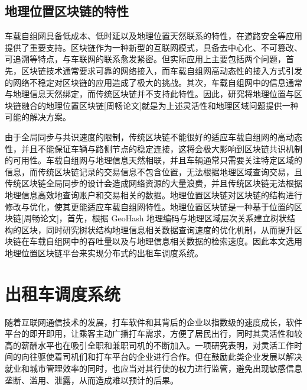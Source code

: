 \subsection{地理位置区块链的特性}
车载自组网具备低成本、低时延以及地理位置天然联系的特性，在道路安全等应用提供了重要支持。区块链作为一种新型的互联网模式，具备去中心化、不可篡改、可追溯等特点，与车联网的联系愈发紧密。但实际应用上主要包括两个问题，首先，区块链技术通常要求可靠的网络接入，而车载自组网高动态性的接入方式引发的网络不稳定对区块链的应用造成了极大的挑战。其次，车载自组网中的信息通常与地理信息天然绑定，而传统区块链并不支持此特性。因此，研究将地理位置与区块链融合的地理位置区块链[周畅论文]就是为上述灵活性和地理区域问题提供一种可能的解决方案。\par
由于全局同步与共识速度的限制，传统区块链不能很好的适应车载自组网的高动态性，并且不能保证车辆与路侧节点的稳定连接，这将会极大影响到区块链共识机制的可用性。车载自组网与地理信息天然相联，并且车辆通常只需要关注特定区域的信息，而传统区块链记录的交易信息不包含位置，无法根据地理区域查询交易，且传统区块链全局同步的设计会造成网络资源的大量浪费，并且传统区块链无法根据地理信息高效地查询账户和交易相关的数据。地理位置区块链对区块链的结构进行修改与优化，使其更能适应车载自组网特性。地理位置区块链是一种基于位置的区块链[周畅论文]，首先，根据 GeoHash 地理编码与地理区域层次关系建立树状结构的区块，同时研究树状结构地理信息相关数据查询速度的优化机制，从而提升区块链在车载自组网中的吞吐量以及与地理信息相关数据的检索速度。因此本文选用地理位置区块链平台来实现分布式的出租车调度系统。\par

\section{出租车调度系统}
随着互联网通信技术的发展，打车软件和其背后的企业以指数级的速度成长，软件平台的即开即用，让乘客主动广播打车需求，方便了居民出行，同时其灵活性和较高的薪酬水平也在吸引全职和兼职司机的不断加入。一项研究表明，对灵活工作时间的向往驱使着司机们和打车平台的企业进行合作。但在鼓励此类企业发展以解决就业和城市管理效率的同时，也应当对其行使的权力进行监管，避免出现敏感信息垄断、滥用、泄露，从而造成难以预计的后果。\par

